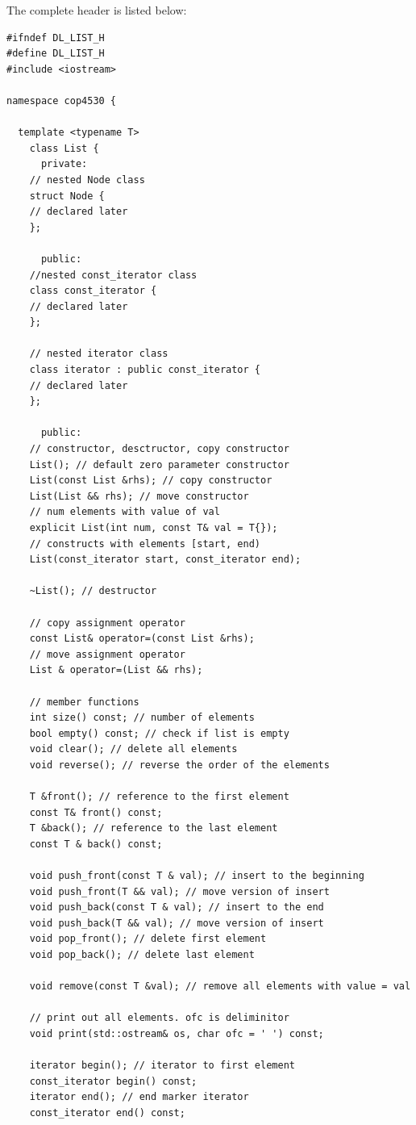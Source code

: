 \documentclass[11pt]{book}
\begin{document}
The complete header is listed below:
\begin{verbatim}
#ifndef DL_LIST_H
#define DL_LIST_H
#include <iostream>

namespace cop4530 {

  template <typename T>
    class List {
      private:
	// nested Node class
	struct Node {
	// declared later
	};

      public:
	//nested const_iterator class
	class const_iterator {
	// declared later
	};

	// nested iterator class
	class iterator : public const_iterator {
	// declared later
	};

      public:
	// constructor, desctructor, copy constructor
	List(); // default zero parameter constructor
	List(const List &rhs); // copy constructor
	List(List && rhs); // move constructor
	// num elements with value of val
	explicit List(int num, const T& val = T{}); 
	// constructs with elements [start, end)
	List(const_iterator start, const_iterator end); 

	~List(); // destructor

	// copy assignment operator
	const List& operator=(const List &rhs);
	// move assignment operator
	List & operator=(List && rhs);

	// member functions
	int size() const; // number of elements
	bool empty() const; // check if list is empty
	void clear(); // delete all elements
	void reverse(); // reverse the order of the elements

	T &front(); // reference to the first element
	const T& front() const;
	T &back(); // reference to the last element
	const T & back() const; 

	void push_front(const T & val); // insert to the beginning
	void push_front(T && val); // move version of insert
	void push_back(const T & val); // insert to the end
	void push_back(T && val); // move version of insert
	void pop_front(); // delete first element
	void pop_back(); // delete last element

	void remove(const T &val); // remove all elements with value = val

	// print out all elements. ofc is deliminitor
	void print(std::ostream& os, char ofc = ' ') const; 

	iterator begin(); // iterator to first element
	const_iterator begin() const;
	iterator end(); // end marker iterator
	const_iterator end() const; 


\end{verbatim}
\end{document}
